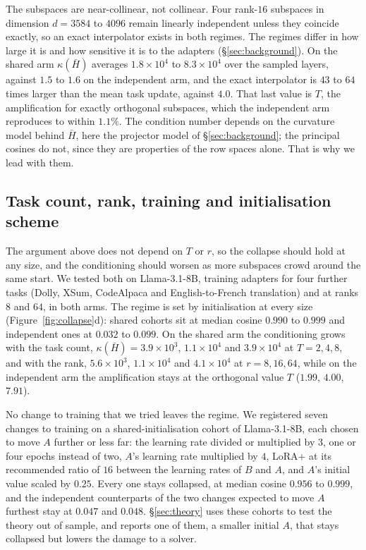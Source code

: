 The subspaces are near-collinear, not collinear. Four rank-$16$ subspaces in
dimension $d = 3584$ to $4096$ remain linearly independent unless they coincide
exactly,
so an exact interpolator exists in both regimes. The regimes differ in how
large it is and how sensitive it is to the adapters
(\S\ref{sec:background}). On the shared arm $\kappa(\bar H)$ averages
$1.8\times10^{4}$ to $8.3\times10^{4}$ over the sampled layers, against $1.5$
to $1.6$ on the independent arm, and the
exact interpolator is $43$ to $64$ times larger than the mean task update,
against $4.0$. That last value is $T$, the amplification for exactly orthogonal
subspaces, which the independent arm reproduces to within $1.1\%$. The
condition number depends on the curvature model behind $\bar H$, here the
projector model of \S\ref{sec:background}; the principal cosines do not, since
they are properties of the row spaces alone. That is why we lead with them.

\subsection{Task count, rank, training and initialisation scheme}\label{subsec:tr}

The argument above does not depend on $T$ or $r$, so the collapse should hold
at any size, and the conditioning should worsen as more subspaces crowd around
the same start. We tested both on Llama-3.1-8B, training adapters for four
further tasks (Dolly, XSum, CodeAlpaca and English-to-French translation) and
at ranks $8$ and $64$, in both arms. The regime is set by initialisation at
every size (Figure~\ref{fig:collapse}d): shared cohorts sit at median cosine
$0.990$ to $0.999$ and independent ones at $0.032$ to $0.099$. On the shared
arm the conditioning grows with the task count,
$\kappa(\bar H) = 3.9\times10^{3}$, $1.1\times10^{4}$ and $3.9\times10^{4}$ at
$T = 2, 4, 8$, and with the rank, $5.6\times10^{3}$, $1.1\times10^{4}$ and
$4.1\times10^{4}$ at $r = 8, 16, 64$, while on the independent arm the
amplification stays at the orthogonal value $T$ ($1.99$, $4.00$, $7.91$).

No change to training that we tried leaves the regime. We registered seven changes to
training on a shared-initialisation cohort of Llama-3.1-8B, each chosen to move
$A$ further or less far: the learning rate divided or multiplied by $3$, one or
four epochs instead of two, $A$'s learning rate multiplied by $4$, LoRA+ at
its recommended ratio of $16$ between the learning rates of $B$ and $A$, and
$A$'s initial value scaled by $0.25$. Every one stays collapsed, at median
cosine $0.956$ to $0.999$, and the independent counterparts of the two changes
expected to move $A$ furthest stay at $0.047$ and $0.048$. \S\ref{sec:theory} uses these
cohorts to test the theory out of sample, and reports one of them, a smaller
initial $A$, that stays collapsed but lowers the damage to a solver.

